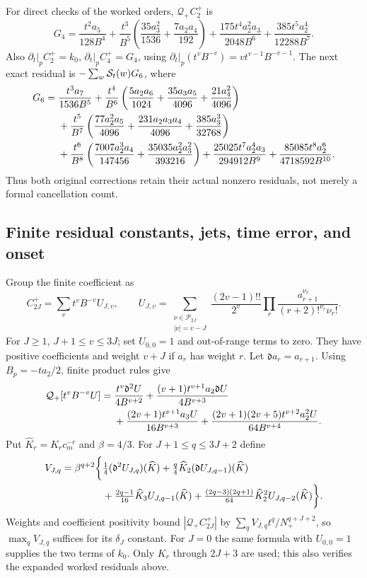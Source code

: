 For direct checks of the worked orders, $\mathcal Q_+C_2^+$ is
\begin{equation}
 G_4=\frac{t^2a_5}{128B^4}
 +\frac{t^3}{B^5}\left(\frac{35a_3^2}{1536}
                         +\frac{7a_2a_4}{192}\right)
 +\frac{175t^4a_2^2a_3}{2048B^6}
 +\frac{385t^5a_2^4}{12288B^7}.
 \label{eq:positive-G4}
\end{equation}
Also $\partial_t|_p C_2^+=k_0$, $\partial_t|_pC_4^+=G_4$,
using $\partial_t|_p(t^vB^{-v})=vt^{v-1}B^{-v-1}$.
The next exact residual is $-\sum_w\mathcal S_t(w)G_6$, where
\begin{align}
 G_6={}&\frac{t^3a_7}{1536B^5}
 +\frac{t^4}{B^6}\left(\frac{5a_2a_6}{1024}
              +\frac{35a_3a_5}{4096}+\frac{21a_4^2}{4096}\right)\notag\\
 &+\frac{t^5}{B^7}\left(\frac{77a_2^2a_5}{4096}
       +\frac{231a_2a_3a_4}{4096}+\frac{385a_3^3}{32768}\right)\notag\\
 &+\frac{t^6}{B^8}\left(\frac{7007a_2^3a_4}{147456}
                       +\frac{35035a_2^2a_3^2}{393216}\right)
 +\frac{25025t^7a_2^4a_3}{294912B^9}
 +\frac{85085t^8a_2^6}{4718592B^{10}}.
 \label{eq:positive-G6}
\end{align}
Thus both original corrections retain their actual nonzero residuals,
not merely a formal cancellation count.

\subsection{Finite residual constants, jets, time error, and onset}
Group the finite coefficient as
\[
 C_{2J}^+=\sum_vt^vB^{-v}U_{J,v},\qquad
 U_{J,v}=\sum_{\substack{\nu\in\mathcal P_{2J}\\|\nu|=v-J}}
  \frac{(2v-1)!!}{2^v}
       \prod_r\frac{a_{r+1}^{\nu_r}}{(r+2)!^{\nu_r}\nu_r!}.
\]
For $J\ge1$, $J+1\le v\le3J$; set $U_{0,0}=1$ and
out-of-range terms to zero. They have positive coefficients and
weight $v+J$ if $a_r$ has weight $r$. Let $\mathfrak d a_r=a_{r+1}$.
Using $B_p=-ta_2/2$, finite product rules give
\begin{align}
 \mathcal Q_+[t^vB^{-v}U]={}&\frac{t^v\mathfrak d^2U}{4B^{v+2}}
 +\frac{(v+1)t^{v+1}a_2\mathfrak dU}{4B^{v+3}}\notag\\
 &+\frac{(2v+1)t^{v+1}a_3U}{16B^{v+3}}
 +\frac{(2v+1)(2v+5)t^{v+2}a_2^2U}{64B^{v+4}}.
 \label{eq:positive-product-residual}
\end{align}
Put $\widehat K_r=K_rc_m^{-r}$ and $\beta=4/3$. For
$J+1\le q\le3J+2$ define
\begin{align}
 V_{J,q}=\beta^{q+2}\bigg\{&\tfrac14(\mathfrak d^2U_{J,q})(\widehat K)
 +\tfrac q4\widehat K_2(\mathfrak dU_{J,q-1})(\widehat K)\notag\\
 &+\tfrac{2q-1}{16}\widehat K_3U_{J,q-1}(\widehat K)
 +\tfrac{(2q-3)(2q+1)}{64}\widehat K_2^2U_{J,q-2}(\widehat K)\bigg\}.
 \label{eq:positive-residual-constants}
\end{align}
Weights and coefficient positivity bound $|\mathcal Q_+C_{2J}^+|$
by $\sum_q V_{J,q}t^q/N_+^{q+J+2}$, so
$\max_qV_{J,q}$ suffices for its $\delta_J$ constant. For $J=0$
the same formula with $U_{0,0}=1$ supplies the two terms of $k_0$.
Only $K_r$ through $2J+3$ are used; this also verifies the expanded
worked residuals above.

